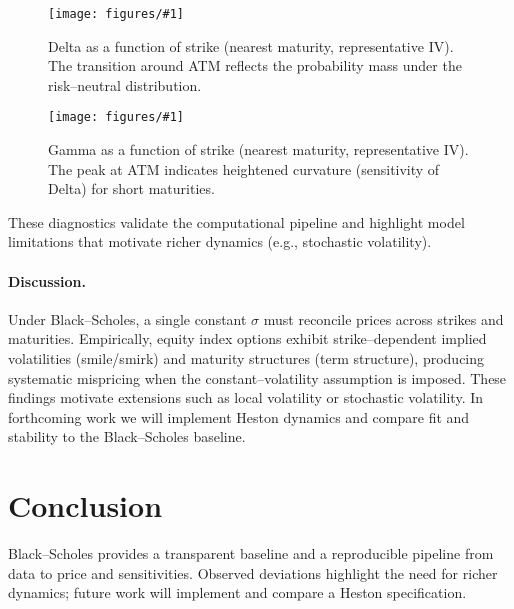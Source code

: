 \documentclass[12pt]{article}
\newcommand{\fig}[3]{%
\begin{figure}[h]
\centering
\texttt{[image: figures/\#1]}
\caption{#2}
\label{fig:#3}
\end{figure}}
\begin{document}
\fig{delta_vs_strike.png}{Delta as a function of strike (nearest maturity, representative IV). The transition around ATM reflects the probability mass under the risk--neutral distribution.}{delta}
\fig{gamma_vs_strike.png}{Gamma as a function of strike (nearest maturity, representative IV). The peak at ATM indicates heightened curvature (sensitivity of Delta) for short maturities.}{gamma}

These diagnostics validate the computational pipeline and highlight model limitations that motivate richer dynamics (e.g., stochastic volatility).

\paragraph{Discussion.}
Under Black--Scholes, a single constant $\sigma$ must reconcile prices across strikes and maturities. Empirically, equity index options exhibit strike--dependent implied volatilities (smile/smirk) and maturity structures (term structure), producing systematic mispricing when the constant--volatility assumption is imposed. These findings motivate extensions such as local volatility or stochastic volatility. In forthcoming work we will implement Heston dynamics and compare fit and stability to the Black--Scholes baseline.


\section{Conclusion}
Black--Scholes provides a transparent baseline and a reproducible pipeline from data to price and sensitivities.
Observed deviations highlight the need for richer dynamics; future work will implement and compare a Heston specification.



\end{document}
